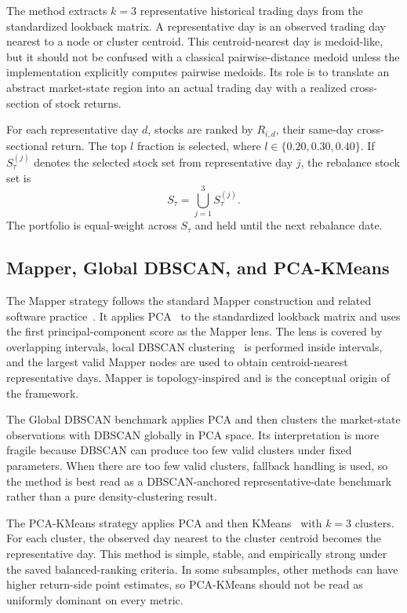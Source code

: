 \documentclass[runningheads]{llncs}
\begin{document}
The method extracts $k=3$ representative historical trading days from the standardized lookback matrix. A representative day is an observed trading day nearest to a node or cluster centroid. This centroid-nearest day is medoid-like, but it should not be confused with a classical pairwise-distance medoid unless the implementation explicitly computes pairwise medoids. Its role is to translate an abstract market-state region into an actual trading day with a realized cross-section of stock returns.

For each representative day $d$, stocks are ranked by $R_{i,d}$, their same-day cross-sectional return. The top $l$ fraction is selected, where $l \in \{0.20,0.30,0.40\}$. If $S_{\tau}^{(j)}$ denotes the selected stock set from representative day $j$, the rebalance stock set is
\begin{equation}
S_{\tau}=\bigcup_{j=1}^{3}S_{\tau}^{(j)}.
\end{equation}
The portfolio is equal-weight across $S_{\tau}$ and held until the next rebalance date.

\subsection{Mapper, Global DBSCAN, and PCA-KMeans}

The Mapper strategy follows the standard Mapper construction and related software practice~\cite{singh2007,carlsson2009,vanveen2019}. It applies PCA~\cite{jolliffe2002} to the standardized lookback matrix and uses the first principal-component score as the Mapper lens. The lens is covered by overlapping intervals, local DBSCAN clustering~\cite{ester1996} is performed inside intervals, and the largest valid Mapper nodes are used to obtain centroid-nearest representative days. Mapper is topology-inspired and is the conceptual origin of the framework.

The Global DBSCAN benchmark applies PCA and then clusters the market-state observations with DBSCAN globally in PCA space. Its interpretation is more fragile because DBSCAN can produce too few valid clusters under fixed parameters. When there are too few valid clusters, fallback handling is used, so the method is best read as a DBSCAN-anchored representative-date benchmark rather than a pure density-clustering result.

The PCA-KMeans strategy applies PCA and then KMeans~\cite{macqueen1967} with $k=3$ clusters. For each cluster, the observed day nearest to the cluster centroid becomes the representative day. This method is simple, stable, and empirically strong under the saved balanced-ranking criteria. In some subsamples, other methods can have higher return-side point estimates, so PCA-KMeans should not be read as uniformly dominant on every metric.
\end{document}
